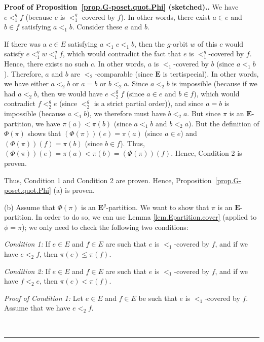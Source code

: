 \documentclass[numbers=enddot,12pt,final,onecolumn,notitlepage,abstracton]{scrartcl}%
\theoremstyle{definition}
\newenvironment{proof}[1][Proof]{\noindent\textbf{#1.} }{\ \rule{0.5em}{0.5em}}
\newcommand{\EE}{{\mathbf{E}}}
\begin{document}
\begin{proof}[Proof of Proposition~\ref{prop.G-poset.quot.Phi} (sketched).]
We have $e<_{1}^{g}f$ (because $e$ is $<_{1}^{g}$-covered by $f$). In other
words, there exist $a\in e$ and $b\in f$ satisfying $a<_{1}b$. Consider these
$a$ and $b$.


If there was a $c \in E$ satisfying $a <_1 c <_1 b$, then
the $g$-orbit $w$ of this $c$ would satisfy
$e <_1^g w <_1^g f$, which would contradict the fact that $e$ is
$<_1^g$-covered by $f$. Hence, there exists no such $c$.
In other words, $a$ is $<_{1}$-covered by $b$ (since $a<_{1}b$). Therefore,
$a$ and $b$ are $<_{2}$-comparable (since $\EE$ is tertispecial). In
other words, we have either $a<_{2}b$ or $a=b$ or $b<_{2}a$. Since $a<_{2}b$
is impossible (because if we had $a<_{2}b$, then we would have $e<_{2}^{g}f$
(since $a\in e$ and $b\in f$), which would contradict $f<_{2}^{g}e$ (since
$<_{2}^{g}$ is a strict partial order)), and since $a=b$ is
impossible (because $a<_{1}b$), we therefore must have $b<_{2}a$. But since
$\pi$ is an $\EE$-partition, we have $\pi\left(  a\right)  <\pi\left(
b\right)  $ (since $a<_{1}b$ and $b<_{2}a$). But the definition of
$\Phi\left(  \pi\right)  $ shows that $\left(  \Phi\left(  \pi\right)
\right)  \left(  e\right)  =\pi\left(  a\right)  $ (since $a\in e$) and
$\left(  \Phi\left(  \pi\right)  \right)  \left(  f\right)  =\pi\left(
b\right)  $ (since $b\in f$). Thus, $\left(  \Phi\left(  \pi\right)  \right)
\left(  e\right)  =\pi\left(  a\right)  <\pi\left(  b\right)  =\left(
\Phi\left(  \pi\right)  \right)  \left(  f\right)  $. Hence, Condition 2 is proven.

Thus, Condition 1 and Condition 2 are proven. Hence,
Proposition~\ref{prop.G-poset.quot.Phi} (a) is proven.

(b) Assume that $\Phi\left(  \pi\right)  $ is an
$\EE^{g}$-partition. We want to show that $\pi$ is an
$\EE$-partition. In order to do so, we can use
Lemma \ref{lem.Epartition.cover}
(applied to $\phi=\pi$); we only need to check the following two conditions:

\textit{Condition 1:} If $e\in E$ and $f\in E$ are such that $e$ is
$<_{1}$-covered by $f$, and if we have $e<_{2}f$, then
$\pi\left(  e\right)  \leq \pi\left(  f\right)  $.

\textit{Condition 2:} If $e\in E$ and $f\in E$ are such that $e$ is
$<_{1}$-covered by $f$, and if we have $f<_{2}e$, then
$\pi\left(  e\right) <\pi\left(  f\right)  $.

\textit{Proof of Condition 1:} Let $e\in E$ and $f\in E$ be such that $e$ is
$<_{1}$-covered by $f$. Assume that we have $e<_{2}f$.


\end{proof}
\end{document}

